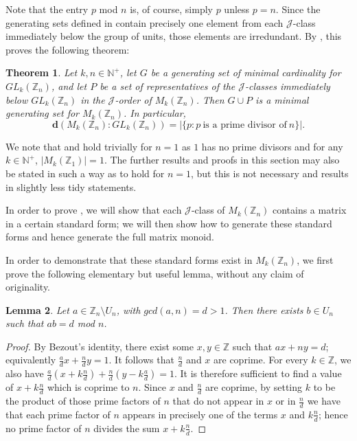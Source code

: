 \documentclass[11pt]{article}
\newtheorem{thm}{Theorem}[subsection]
\newtheorem{lemma}[thm]{Lemma}
\numberwithin{equation}{section}
\newcommand{\set}[2]{\ensuremath{\{#1 : #2 \}}}
\newcommand{\J}{\mathscr{J}}
\newcommand{\N}{\mathbb{N}}
\newcommand{\Np}{\N^{+}}
\newcommand{\Z}{\mathbb{Z}}
\renewcommand{\d}{\mathbf{d}}
\begin{document}
Note that the entry $p$ mod $n$ is, of course, simply $p$ unless $p = n$. Since
the generating sets defined in  contain precisely one
element from each $\J$-class immediately below the group of units, those
elements are irredundant. By , this proves the following
theorem:
\begin{thm}
  Let $k,n \in \Np$, let $G$ be a generating set of minimal cardinality for
  $GL_k(\Z_n)$, and let $P$ be a set of representatives of the
  $\J$-classes immediately below $GL_k(\Z_n)$ in the $\J$-order of
  $M_k(\Z_n)$. Then $G \cup P$ is a minimal generating set for $M_k(\Z_n)$.
  In particular,
  $$\d(M_k(\Z_n) : GL_k(\Z_n))
                       =
                       |\set{p}{p\ \text{is a prime divisor of}\ n}|.
  $$
\end{thm}

We note that  and  hold trivially for
$n = 1$ as $1$ has no prime divisors and for any $k \in \Np$, $|M_k(\Z_1)| = 1$.
The further results and proofs in this section may also be stated in such a way
as to hold for $n=1$, but this is not necessary and results in slightly less
tidy statements.

In order to prove , we will show that each $\J$-class of
$M_k(\Z_n)$ contains a matrix in a certain standard form; we will then show how
to generate these standard forms and hence generate the full matrix monoid.

In order to demonstrate that these standard forms exist in $M_k(\Z_n)$, we first
prove the following elementary but useful lemma, without any claim of
originality.

\begin{lemma}
  Let $a \in \Z_n \setminus U_n$, with $gcd(a, n) = d > 1$. Then there exists $b
  \in U_n$ such that $ab = d$ mod $n$.
\end{lemma}
\begin{proof}
  By Bezout's identity, there exist some $x, y \in \Z$ such that $ax + ny = d$;
  equivalently $\frac{a}{d}x + \frac{n}{d}y = 1$. It follows that
  $\frac{n}{d}$ and $x$ are coprime. For every $k \in \Z$, we also have
  $\frac{a}{d}(x + k\frac{n}{d}) + \frac{n}{d}(y - k\frac{a}{d}) = 1$. It is
  therefore sufficient to find a value of $x + k\frac{n}{d}$ which is coprime to
  $n$. Since $x$ and $\frac{n}{d}$ are coprime, by setting $k$ to be the product
  of those prime factors of $n$ that do not appear in $x$ or in $\frac{n}{d}$ we
  have that each prime factor of $n$ appears in precisely one of the terms $x$
  and $k\frac{n}{d}$; hence no prime factor of $n$ divides the sum $x +
  k\frac{n}{d}$.
\end{proof}
\end{document}
